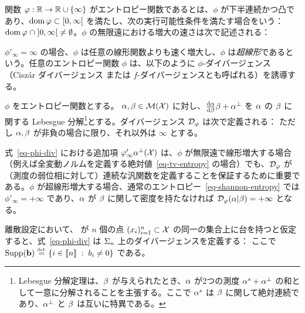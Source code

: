 \begin{defn}[エントロピー関数]
\label{def_entropy}
関数 $\varphi : \mathbb{R} \to \mathbb{R} \cup \{\infty\}$ がエントロピー関数であるとは、$\phi$ が下半連続かつ凸であり、$\operatorname{dom} \varphi\subset [0,\infty[$ を満たし、次の実行可能性条件を満たす場合をいう：$\operatorname{dom} \varphi \; \cap\;  ]0, \infty[\; \neq \emptyset$。$\phi$ の無限遠における増大の速さは次で記述される：
\end{defn}

$\phi'_\infty = \infty$ の場合、$\phi$ は任意の線形関数よりも速く増大し、$\phi$ は\emph{超線形}であるという。任意のエントロピー関数 $\phi$ は、以下のように $\phi$-ダイバージェンス（Cisz\'ar ダイバージェンス \citep{ciszar1967information,ali1966general} または $f$-ダイバージェンスとも呼ばれる）を誘導する。



\begin{defn}
\label{def_divergence}
$\phi$ をエントロピー関数とする。
$\alpha,\beta \in \mathcal{M}(\mathcal{X})$ に対し、$\frac{\mathrm{d} \alpha}{\mathrm{d} \beta} \beta + \alpha^{\perp}$ を $\alpha$ の $\beta$ に関する Lebesgue 分解\footnote{Lebesgue 分解定理は、$\beta$ が与えられたとき、$\alpha$ が2つの測度 $\alpha^s + \alpha^\perp$ の和として一意に分解されることを主張する。ここで $\alpha^s$ は $\beta$ に関して絶対連続であり、$\alpha^\perp$ と $\beta$ は互いに特異である。}とする。ダイバージェンス $\mathcal{D}_\varphi$ は次で定義される：
ただし $\alpha,\beta$ が非負の場合に限り、それ以外は $\infty$ とする。
\end{defn}%

式~\eqref{eq-phi-div} における追加項 $\varphi'_\infty \alpha^{\perp}(\mathcal{X})$ は、$\phi$ が無限遠で線形増大する場合（例えば全変動ノルムを定義する絶対値~\eqref{eq-tv-entropy} の場合）でも、$\mathcal{D}_\varphi$ が（測度の弱位相に対して）連続な汎関数を定義することを保証するために重要である。$\phi$ が超線形増大する場合、\eg 通常のエントロピー~\eqref{eq-shannon-entropy} では $\phi'_\infty=+\infty$ であり、$\alpha$ が $\beta$ に関して密度を持たなければ $\mathcal{D}_\varphi (\alpha|\beta) = +\infty$ となる。

離散設定において、
が $n$ 個の点 $(x_i)_{i=1}^n \subset \mathcal{X}$ の同一の集合上に台を持つと仮定すると、式~\eqref{eq-phi-div} は $\Sigma_n$ 上のダイバージェンスを定義する：
ここで $\operatorname{Supp}(\mathrm{\textbf{b}}) \stackrel{\mbox{\upshape\tiny def.}}{=} \left\{ i \in \llbracket n\rrbracket \;:\;  b_i \neq 0  \right\}$ である。

